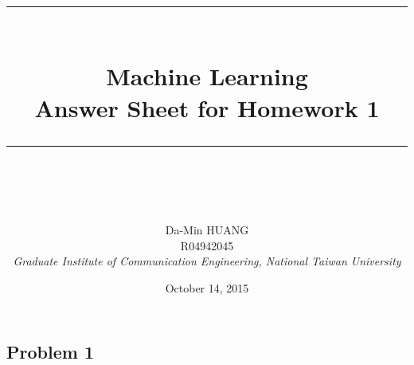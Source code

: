 \documentclass[12pt]{article}
\newcommand{\horrule}[1]{\rule{\linewidth}{#1}}
\begin{document}
\baselineskip 6.5mm
\setlength{\parindent}{0pt}
\title{ 
\normalfont \normalsize 
\horrule{0.5pt} \\[0.4cm]
\huge { \Huge Machine Learning \\ \large Answer Sheet for Homework 1 }\\ %
\horrule{2pt} \\ [0.5cm]
}
\author{ { \Large Da-Min HUANG } \\
{\small R04942045} \\
{\small\textit{Graduate Institute of Communication Engineering, National Taiwan University}}
}
\date{October 14, 2015}
\allowdisplaybreaks[4]
\maketitle

\subsection*{Problem 1}
\end{document}

